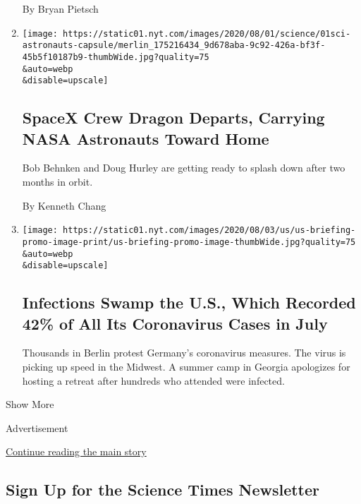 \begin{enumerate}
  By Bryan Pietsch
\item
  \href{/2020/08/01/science/nasa-spacex-astronauts.html}{}

  \texttt{[image: https://static01.nyt.com/images/2020/08/01/science/01sci-astronauts-capsule/merlin\_175216434\_9d678aba-9c92-426a-bf3f-45b5f10187b9-thumbWide.jpg?quality=75\\\&auto=webp\\\&disable=upscale]}

  \hypertarget{spacex-crew-dragon-departs-carrying-nasa-astronauts-toward-home}{%
  \subsection{SpaceX Crew Dragon Departs, Carrying NASA Astronauts
  Toward
  Home}\label{spacex-crew-dragon-departs-carrying-nasa-astronauts-toward-home}}

  Bob Behnken and Doug Hurley are getting ready to splash down after two
  months in orbit.

  By Kenneth Chang
\item
  \href{/2020/08/01/world/coronavirus-covid-19.html}{}

  \texttt{[image: https://static01.nyt.com/images/2020/08/03/us/us-briefing-promo-image-print/us-briefing-promo-image-thumbWide.jpg?quality=75\\\&auto=webp\\\&disable=upscale]}

  \hypertarget{infections-swamp-the-us-which-recorded-42-of-all-its-coronavirus-cases-in-july}{%
  \subsection{Infections Swamp the U.S., Which Recorded 42\% of All Its
  Coronavirus Cases in
  July}\label{infections-swamp-the-us-which-recorded-42-of-all-its-coronavirus-cases-in-july}}

  Thousands in Berlin protest Germany's coronavirus measures. The virus
  is picking up speed in the Midwest. A summer camp in Georgia
  apologizes for hosting a retreat after hundreds who attended were
  infected.
\end{enumerate}

Show More

Advertisement

\protect\hyperlink{after-mid2}{Continue reading the main story}

\hypertarget{sign-up-for-the-science-times-newsletter}{%
\subsection{Sign Up for the Science Times
Newsletter}\label{sign-up-for-the-science-times-newsletter}}

